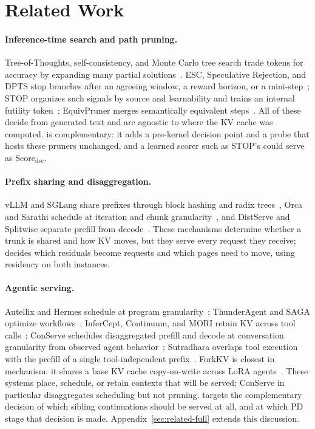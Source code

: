 \section{Related Work}
\label{sec:related}

\paragraph{Inference-time search and path pruning.}
Tree-of-Thoughts, self-consistency, and Monte Carlo tree search trade tokens for accuracy by expanding many partial solutions~\cite{tot,selfconsistency,mctsllm,cot}.
ESC, Speculative Rejection, and DPTS stop branches after an agreeing window, a reward horizon, or a mini-step~\cite{esc,specrej,dpts}; STOP organizes such signals by source and learnability and trains an internal futility token~\cite{stoploss}; EquivPruner merges semantically equivalent steps~\cite{equivpruner}.
All of these decide from generated text and are agnostic to where the KV cache was computed.
\sys is complementary: it adds a pre-kernel decision point and a probe that hosts these pruners unchanged, and a learned scorer such as STOP's could serve as $\mathrm{Score}_{\mathrm{dec}}$.

\paragraph{Prefix sharing and disaggregation.}
vLLM and SGLang share prefixes through block hashing and radix trees~\cite{vllm,sglang}, Orca and Sarathi schedule at iteration and chunk granularity~\cite{orca,sarathi}, and DistServe and Splitwise separate prefill from decode~\cite{distserve,splitwise}.
These mechanisms determine whether a trunk is shared and how KV moves, but they serve every request they receive; \sys decides which residuals become requests and which pages need to move, using residency on both instances.

\paragraph{Agentic serving.}
Autellix and Hermes schedule at program granularity~\cite{autellix,hermes}; ThunderAgent and SAGA optimize workflows~\cite{thunderagent,saga}; InferCept, Continuum, and MORI retain KV across tool calls~\cite{infercept,continuum,mori}; ConServe schedules disaggregated prefill and decode at conversation granularity from observed agent behavior~\cite{conserve}; Sutradhara overlaps tool execution with the prefill of a single tool-independent prefix~\cite{sutradhara}.
ForkKV is closest in mechanism: it shares a base KV cache copy-on-write across LoRA agents~\cite{forkkv}.
These systems place, schedule, or retain contexts that will be served; ConServe in particular disaggregates scheduling but not pruning.
\sys targets the complementary decision of which sibling continuations should be served at all, and at which PD stage that decision is made.
Appendix~\ref{sec:related-full} extends this discussion.
